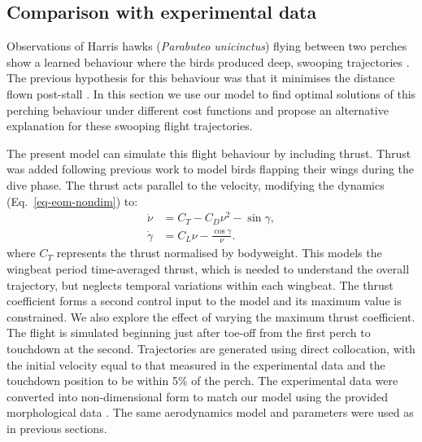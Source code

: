 \subsection{Comparison with experimental data} \label{sec-results-perching}

Observations of Harris hawks (\emph{Parabuteo unicinctus}) flying between two perches show a learned behaviour where the birds produced deep, swooping trajectories \cite{kleinheerenbrinkOptimizationAvianPerching2022}. The previous hypothesis for this behaviour was that it minimises the distance flown post-stall \cite{kleinheerenbrinkOptimizationAvianPerching2022,wuestAgilePerchingManeuvers2024}. In this section we use our model to find optimal solutions of this perching behaviour under different cost functions and propose an alternative explanation for these swooping flight trajectories.

The present model can simulate this flight behaviour by including thrust. Thrust was added following previous work \cite{kleinheerenbrinkOptimizationAvianPerching2022,wuestAgilePerchingManeuvers2024} to model birds flapping their wings during the dive phase. The thrust acts parallel to the velocity, modifying the dynamics (Eq.~\ref{eq-eom-nondim}) to:
\begin{equation}
    \begin{aligned}
        \dot{\nu}    & = C_T - C_D\nu^2 - \sin\gamma,     \\
        \dot{\gamma} & = C_L\nu - \frac{\cos\gamma}{\nu}.
    \end{aligned}
\end{equation}
where $C_T$ represents the thrust normalised by bodyweight. This models the wingbeat period time-averaged thrust, which is needed to understand the overall trajectory, but neglects temporal variations within each wingbeat. The thrust coefficient forms a second control input to the model and its maximum value is constrained. We also explore the effect of varying the maximum thrust coefficient. The flight is simulated beginning just after toe-off from the first perch to touchdown at the second. Trajectories are generated using direct collocation, with the initial velocity equal to that measured in the experimental data \cite{kleinheerenbrinkOptimizationAvianPerching2022} and the touchdown position to be within 5\% of the perch. The experimental data were converted into non-dimensional form to match our model using the provided morphological data \cite{kleinheerenbrinkOptimizationAvianPerching2022}. The same aerodynamics model and parameters were used as in previous sections.

